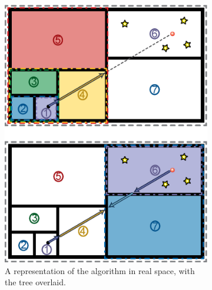 \begin{figure}
        \centering
        \begin{subfigure}[b]{0.45\textwidth}
                \includegraphics[width=\textwidth]{graphics/RT_algorithm.eps}
                \caption{A representation of the algorithm in real space, with the tree overlaid.}
                \label{fig:treeclimb}
        \end{subfigure}
        ~ 
        \begin{subfigure}[b]{0.45\textwidth}

\end{subfigure}
\end{figure}
